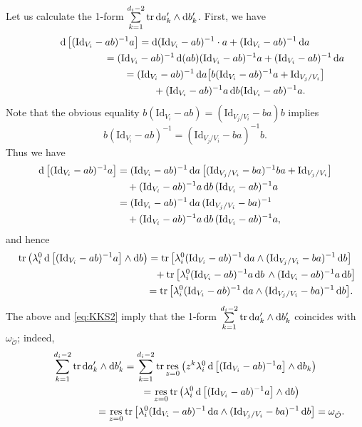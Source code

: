 \documentclass[pdftex]{sigma}
\numberwithin{equation}{section}
\theoremstyle{definition}
\newcommand{\tr}{\operatorname{tr}}
\newcommand{\unit}{\mathrm{Id}}
\newcommand{\res}{\operatorname*{res}}
\newcommand{\bO}{\mathcal{O}}
\newcommand{\rd}{\mathop{\mathrm{d}\!}\mathstrut}
\begin{document}
Let us calculate the 1-form
$\sum\limits_{k=1}^{d_i-2}\tr \rd a'_k \wedge \rd b'_k$.
First, we have
\begin{gather*}
\rd \left[ (\unit_{V_i}-ab)^{-1}a \right]
 = \rd (\unit_{V_i}-ab)^{-1} \cdot a + (\unit_{V_i}-ab)^{-1} \rd a \\
\phantom{\rd \left[ (\unit_{V_i}-ab)^{-1}a \right]}{}
= (\unit_{V_i}-ab)^{-1} \rd (ab) (\unit_{V_i}-ab)^{-1}a
+ (\unit_{V_i}-ab)^{-1} \rd a \\
\phantom{\rd \left[ (\unit_{V_i}-ab)^{-1}a \right]}{}
= (\unit_{V_i}-ab)^{-1} \rd a
\big[ b (\unit_{V_i}-ab)^{-1}a + \unit_{V_j/V_i} \big] \\
\phantom{\rd \left[ (\unit_{V_i}-ab)^{-1}a \right]=}{}
+ (\unit_{V_i}-ab)^{-1} a\rd b (\unit_{V_i}-ab)^{-1}a.
\end{gather*}
Note that the obvious equality
$b (\unit_{V_i}-ab) = (\unit_{V_j/V_i}-ba) b$ implies
\[
b (\unit_{V_i}-ab)^{-1} =
(\unit_{V_j/V_i}-ba)^{-1} b.
\]
Thus we have
\begin{align*}
\rd \left[ (\unit_{V_i}-ab)^{-1}a \right]
&= (\unit_{V_i}-ab)^{-1} \rd a
\left[ (\unit_{V_j/V_i}-ba)^{-1} ba + \unit_{V_j/V_i} \right] \\
&\quad + (\unit_{V_i}-ab)^{-1} a\rd b\, (\unit_{V_i}-ab)^{-1}a \\
&=(\unit_{V_i}-ab)^{-1} \rd a\, (\unit_{V_j/V_i}-ba)^{-1} \\
&\quad + (\unit_{V_i}-ab)^{-1} a\rd b\, (\unit_{V_i}-ab)^{-1}a,
\end{align*}
and hence
\begin{gather*}
\tr\left(\lambda_i^0 \rd \left[ (\unit_{V_i}-ab)^{-1}a \right] \wedge \rd b \right)
=\tr\big[ \lambda_i^0 (\unit_{V_i}-ab)^{-1} \rd a
\wedge (\unit_{V_j/V_i}-ba)^{-1} \rd b \big] \\
\phantom{\tr\left(\lambda_i^0 \rd \left[ (\unit_{V_i}-ab)^{-1}a \right] \wedge \rd b \right) =}{}
 + \tr\left[ \lambda_i^0 (\unit_{V_i}-ab)^{-1} a\rd b\,
\wedge (\unit_{V_i}-ab)^{-1}a\rd b \right] \\
\phantom{\tr\left(\lambda_i^0 \rd \left[ (\unit_{V_i}-ab)^{-1}a \right] \wedge \rd b \right)}{}
=\tr\big[ \lambda_i^0 (\unit_{V_i}-ab)^{-1} \rd a
\wedge (\unit_{V_j/V_i}-ba)^{-1} \rd b \big].
\end{gather*}
The above and \eqref{eq:KKS2} imply that the 1-form
$\sum\limits_{k=1}^{d_i-2} \tr \rd a'_k \wedge \rd b'_k$
coincides with $\omega_{\check{\bO}}$; indeed,
\begin{gather*}
\sum_{k=1}^{d_i-2} \tr \rd a'_k \wedge \rd b'_k
=
\sum_{k=1}^{d_i-2} \tr \res_{z=0} \big(
z^k \lambda_i^0 \rd \left[ (\unit_{V_i}-ab)^{-1}a \right]
\wedge \rd b_k \big) \\
\hphantom{\sum_{k=1}^{d_i-2} \tr \rd a'_k \wedge \rd b'_k}{}
= \res_{z=0}\tr \big(
\lambda_i^0 \rd \left[ (\unit_{V_i}-ab)^{-1}a \right]
\wedge \rd b \big) \\
\hphantom{\sum_{k=1}^{d_i-2} \tr \rd a'_k \wedge \rd b'_k}{}
= \res_{z=0}\tr\big[
\lambda_i^0 (\unit_{V_i}-ab)^{-1} \rd a
\wedge (\unit_{V_j/V_i}-ba)^{-1} \rd b \big]  =\omega_{\check{\bO}}.
\end{gather*}
\end{document}
